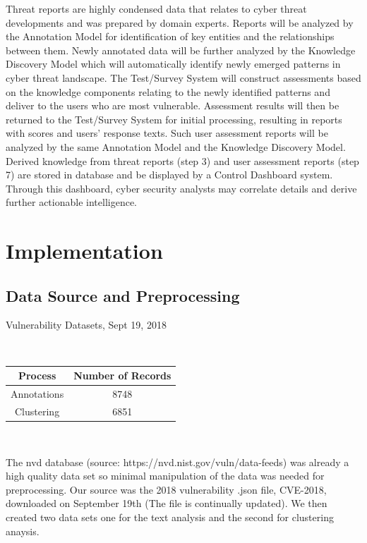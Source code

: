 \documentclass{article} %
\begin{document}
Threat reports are highly condensed data that relates to cyber threat developments and was prepared by domain experts. Reports will be analyzed by the Annotation Model for identification of key entities and the relationships between them. Newly annotated data will be further analyzed by the Knowledge Discovery Model which will automatically identify newly emerged patterns in cyber threat landscape. The Test/Survey System will construct assessments based on the knowledge components relating to the newly identified patterns and deliver to the users who are most vulnerable. Assessment results will then be returned to the Test/Survey System for initial processing, resulting in reports with scores and users' response texts. Such user assessment reports will be analyzed by the same Annotation Model and the Knowledge Discovery Model. Derived knowledge from threat reports (step 3) and user assessment reports (step 7) are stored in database and be displayed by a Control Dashboard system. Through this dashboard, cyber security analysts may correlate details and derive further actionable intelligence.

\section{Implementation}
\subsection{Data Source and Preprocessing}

\begin{center} 
\caption{Vulnerability Datasets, Sept 19, 2018} \\
\begin{tabular}{ c c  } \\ \hline
 Process & Number of Records \\ \hline
 Annotations & 8748  \\  \hline
 Clustering & 6851  \\   \hline
\end{tabular} \\
\label{table:1}
\end{center}

The nvd database (source:  https://nvd.nist.gov/vuln/data-feeds) was already a high quality data set so minimal manipulation of the data was needed for preprocessing. Our source was the 2018 vulnerability .json file, CVE-2018, downloaded on September 19th (The file is continually updated). We then created two data sets one for the text analysis and the second for clustering anaysis.  
\end{document}
